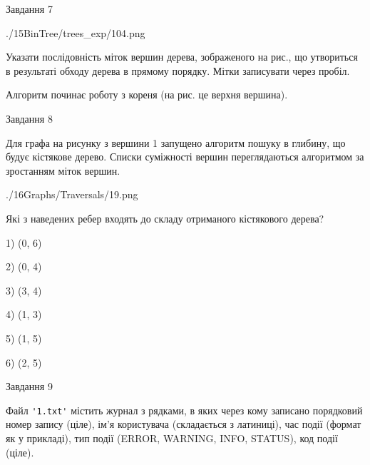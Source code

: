 \documentclass[12pt, ukrainian]{article}
\def\code#1{\Verb!#1!}
\begin{document}
{\vspace{10mm}\par

\newpage
\begin{minipage}[t]{9.7cm}
               
{\begin{center}Завдання {7}\end{center}}
\vspace{-6mm}

\begin{center}
	{./15BinTree/trees_exp/104.png}
\end{center}
Указати послідовність міток вершин дерева, зображеного на рис., що утвориться в результаті обходу дерева в прямому порядку. Мітки записувати через пробіл.\par Алгоритм починає роботу з кореня (на рис. це верхня вершина).\par

\end{minipage}
\vline \hspace{8mm}
\begin{minipage}[t]{8.0cm}
               
{\begin{center}Завдання {8}\end{center}}
\vspace{-6mm}
Для графа на рисунку з вершини 1 запущено алгоритм пошуку в глибину, що будує кістякове дерево. Списки суміжності вершин переглядаються алгоритмом за зростанням міток вершин.\par
\begin{center}
	{./16Graphs/Traversals/19.png}
\end{center}
\par Які з наведених ребер входять до складу отриманого кістякового дерева?\par
1) (0, 6)\par
2) (0, 4)\par
3) (3, 4)\par
4) (1, 3)\par
5) (1, 5)\par
6) (2, 5)\par
{\vskip 15pt} \par

\end{minipage}

               
{\begin{center}Завдання {9}\end{center}}
\vspace{-6mm}
Файл \code{'1.txt'} містить журнал з рядками, в яких через кому записано поряд\-ко\-вий номер запису (ціле), ім'я користувача (складається з латиниці), час події (фор\-мат як у прикладі), тип події (ERROR, WARNING, INFO, STATUS), код події (ціле).

}
\end{document}
